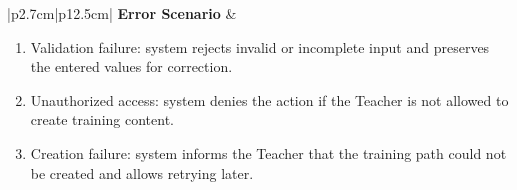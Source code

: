 \begin{table}[H]
\begin{tabular}{|p{2.7cm}|p{12.5cm}|}
        \textbf{Error Scenario} & \begin{minipage}[t]{\linewidth}
        \begin{enumerate}[topsep=0pt,itemsep=1pt,parsep=0pt,partopsep=0pt]
            \item Validation failure: system rejects invalid or incomplete input and preserves the entered values for correction.
            \item Unauthorized access: system denies the action if the Teacher is not allowed to create training content.
            \item Creation failure: system informs the Teacher that the training path could not be created and allows retrying later.
        \end{enumerate}
        \end{minipage} \\ \hline
    \end{tabular}
    \label{tab:teacher-create-tp}
\end{table}

